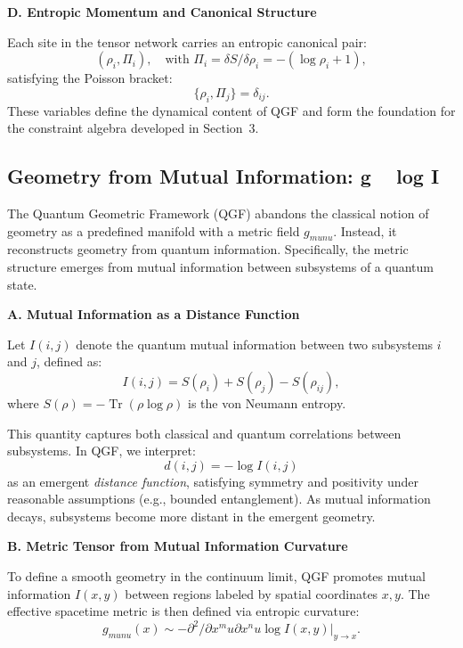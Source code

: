 \documentclass[11pt]{article}
\DeclareMathOperator*{\Tr}{Tr}
\def\mu{mu}
\def\nu{nu}
\def\frac#1#2{#1/#2}
\def\texorpdfstring#1#2{#2}
\begin{document}
\vspace{0.5em}
\noindent\textbf{D. Entropic Momentum and Canonical Structure}

Each site in the tensor network carries an entropic canonical pair:
\[
(\rho_i, \Pi_i), \quad \text{with } \Pi_i = \frac{\delta S}{\delta \rho_i} = -(\log \rho_i + 1),
\]
satisfying the Poisson bracket:
\[
\{\rho_i, \Pi_j\} = \delta_{ij}.
\]
These variables define the dynamical content of QGF and form the foundation for the constraint algebra developed in Section~3.

\subsection[
  Geometry from Mutual Information
]{Geometry from Mutual Information: \texorpdfstring{\( g_{\mu\nu}(x) \sim -\partial^2 \log I(x,y) \)}{g ~ log I}}


The Quantum Geometric Framework (QGF) abandons the classical notion of geometry as a predefined manifold with a metric field \( g_{\mu\nu} \). Instead, it reconstructs geometry from quantum information. Specifically, the metric structure emerges from mutual information between subsystems of a quantum state.

\vspace{0.5em}
\noindent\textbf{A. Mutual Information as a Distance Function}

Let \( I(i,j) \) denote the quantum mutual information between two subsystems \( i \) and \( j \), defined as:
\[
I(i,j) = S(\rho_i) + S(\rho_j) - S(\rho_{ij}),
\]
where \( S(\rho) = -\Tr(\rho \log \rho) \) is the von Neumann entropy.

This quantity captures both classical and quantum correlations between subsystems. In QGF, we interpret:
\[
d(i,j) = -\log I(i,j)
\]
as an emergent \emph{distance function}, satisfying symmetry and positivity under reasonable assumptions (e.g., bounded entanglement). As mutual information decays, subsystems become more distant in the emergent geometry.

\vspace{0.5em}
\noindent\textbf{B. Metric Tensor from Mutual Information Curvature}

To define a smooth geometry in the continuum limit, QGF promotes mutual information \( I(x,y) \) between regions labeled by spatial coordinates \( x, y \). The effective spacetime metric is then defined via entropic curvature:
\[
g_{\mu\nu}(x) \sim -\frac{\partial^2}{\partial x^\mu \partial x^\nu} \log I(x,y)\Big|_{y \to x}.
\]
\end{document}
